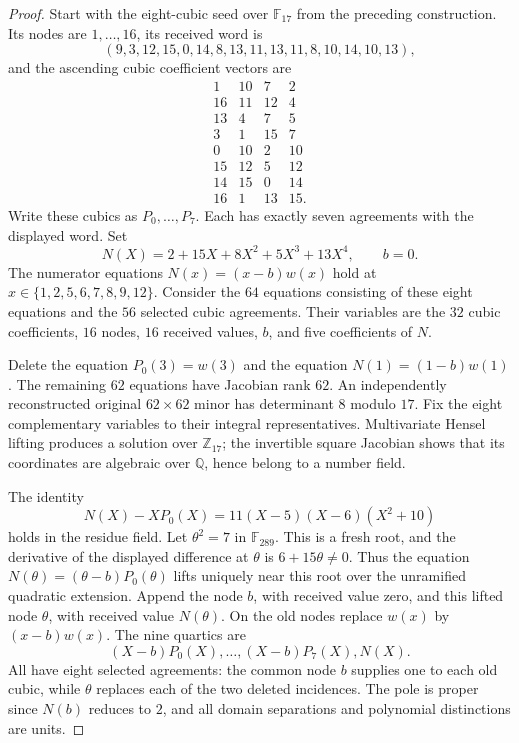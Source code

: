 \begin{proof}
Start with the eight-cubic seed over $\mathbb F_{17}$ from the preceding construction. Its nodes are $1,\ldots,16$, its received word is
\[
(9,3,12,15,0,14,8,13,11,13,11,8,10,14,10,13),
\]
and the ascending cubic coefficient vectors are
\[
\begin{array}{rrrr}
1&10&7&2\\16&11&12&4\\13&4&7&5\\3&1&15&7\\
0&10&2&10\\15&12&5&12\\14&15&0&14\\16&1&13&15.
\end{array}
\]
Write these cubics as $P_0,\ldots,P_7$. Each has exactly seven agreements with the displayed word. Set
\[
 N(X)=2+15X+8X^2+5X^3+13X^4,\qquad b=0.
\]
The numerator equations $N(x)=(x-b)w(x)$ hold at
$x\in\{1,2,5,6,7,8,9,12\}$. Consider the $64$ equations consisting of these eight equations and the $56$ selected cubic agreements. Their variables are the $32$ cubic coefficients, $16$ nodes, $16$ received values, $b$, and five coefficients of $N$.

Delete the equation $P_0(3)=w(3)$ and the equation $N(1)=(1-b)w(1)$. The remaining $62$ equations have Jacobian rank $62$. An independently reconstructed original $62\times62$ minor has determinant $8$ modulo $17$. Fix the eight complementary variables to their integral representatives. Multivariate Hensel lifting produces a solution over $\mathbb Z_{17}$; the invertible square Jacobian shows that its coordinates are algebraic over $\mathbb Q$, hence belong to a number field.

The identity
\[
 N(X)-XP_0(X)=11(X-5)(X-6)(X^2+10)
\]
holds in the residue field. Let $\theta^2=7$ in $\mathbb F_{289}$. This is a fresh root, and the derivative of the displayed difference at $\theta$ is $6+15\theta\ne0$. Thus the equation
$N(\theta)=(\theta-b)P_0(\theta)$ lifts uniquely near this root over the unramified quadratic extension. Append the node $b$, with received value zero, and this lifted node $\theta$, with received value $N(\theta)$. On the old nodes replace $w(x)$ by $(x-b)w(x)$. The nine quartics are
\[
 (X-b)P_0(X),\ldots,(X-b)P_7(X),N(X).
\]
All have eight selected agreements: the common node $b$ supplies one to each old cubic, while $\theta$ replaces each of the two deleted incidences. The pole is proper since $N(b)$ reduces to $2$, and all domain separations and polynomial distinctions are units.


\end{proof}
